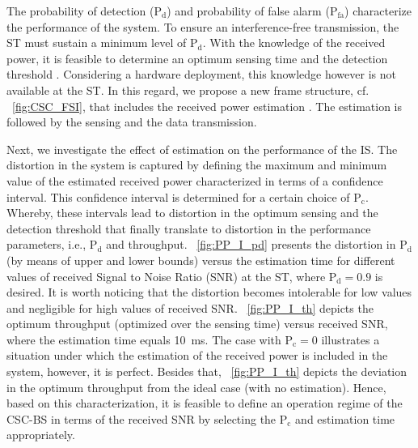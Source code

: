 \documentclass[draftcls, onecolumn, 11pt]{IEEEtran}
\newcommand{\sub}[1]{_{\text{#1}}}
\newcommand{\pc}{\text{P}\sub{c}}
\newcommand{\pd}{\text{P}\sub{d}}
\newcommand{\pf}{\text{P}\sub{fa}}
\begin{document}
The probability of detection ($\pd$) and probability of false alarm ($\pf$) characterize the performance of the system. To ensure an interference-free transmission, the ST must sustain a minimum level of $\pd$. With the knowledge of the received power, it is feasible to determine an optimum sensing time and the detection threshold \cite{Liang08}. Considering a hardware deployment, this knowledge however is not available at the ST. In this regard, we propose a new frame structure, cf. \figurename~\ref{fig:CSC_FSI}, that includes the received power estimation \cite{Kaushik15_CC}. The estimation is followed by the sensing and the data transmission. 

Next, we investigate the effect of estimation on the performance of the IS.
The distortion in the system is captured by defining the maximum and minimum value of the estimated received power characterized in terms of a confidence interval. This confidence interval is determined for a certain choice of $\pc$. Whereby, these intervals lead to distortion in the optimum sensing and the detection threshold that finally translate to distortion in the performance parameters, i.e., $\pd$ and throughput. 
 \figurename~{\ref{fig:PP_I_pd}} presents the distortion in $\pd$ (by means of upper and lower bounds) versus the estimation time for different values of received Signal to Noise Ratio (SNR) at the ST, where $\pd = 0.9$ is desired. 
It is worth noticing that the distortion becomes intolerable for low values and negligible for high values of received SNR. \figurename~{\ref{fig:PP_I_th}} depicts the optimum throughput (optimized over the sensing time) versus received SNR, where the estimation time equals \SI{10}{ms}. The case with $\pc = 0$ illustrates a situation under which the estimation of the received power is included in the system, however, it is perfect. Besides that, \figurename~{\ref{fig:PP_I_th}} depicts the deviation in the optimum throughput from the ideal case (with no estimation). 
Hence, based on this characterization, it is feasible to define an operation regime of the CSC-BS in terms of the received SNR by selecting the $\pc$ and estimation time appropriately. 
\end{document}
